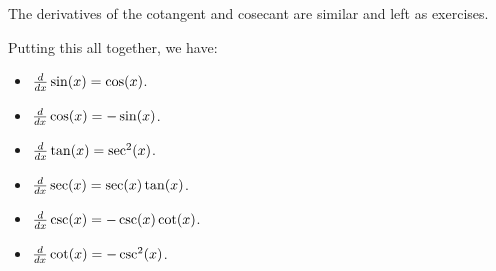The derivatives of the cotangent and cosecant are similar and left as
exercises. 

Putting this all together, we have:

\begin{mainTheorem} \hfil
\begin{itemize}
\item $\frac{d}{dx} \sin(x) = \cos(x)$.
\item $\frac{d}{dx} \cos(x) = -\sin(x)$.
\item $\frac{d}{dx} \tan(x) = \sec^2(x)$.
\item $\frac{d}{dx} \sec(x) = \sec(x)\tan(x)$.
\item $\frac{d}{dx} \csc(x) = -\csc(x)\cot(x)$.
\item $\frac{d}{dx} \cot(x) = -\csc^2(x)$.
\end{itemize}
\end{mainTheorem}





